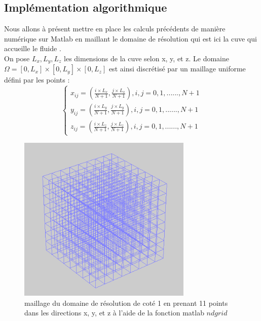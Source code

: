\documentclass[a4paper,12pt,titlepage]{report}
\begin{document}
\begin{onehalfspace}
\subsection{Implémentation algorithmique}

Nous allons à présent mettre en place les calculs précédents de manière numérique sur Matlab en maillant le domaine de résolution qui est ici la cuve qui accueille le fluide .  
\\ 
On pose $ L_x,  L_y,  L_z$ les dimensions de la cuve selon x, y, et z.
\newline
Le domaine $\Omega = [0, L_x]\times[0, L_y]\times[0, L_z]$ est ainsi discrétisé par un maillage uniforme défini par les points : 
\\

\[
\left\{
\begin{array}{ccc}
  x_{ij} = (\frac{i\times L_x}{N+1} ,\frac{j\times L_x}{N+1}),    i,j=0,1,......,N+1\\
  y_{ij} = (\frac{i\times L_y}{N+1} ,\frac{j\times L_y}{N+1}),    i,j=0,1,......,N+1  \\
 z_{ij} = (\frac{i\times L_z}{N+1} ,\frac{j\times L_z}{N+1}),    i,j=0,1,......,N+1  
\end{array}
\right.
\]
\begin{figure}[!h]
	\begin{center}
	\centering
		\includegraphics[height = 8cm, keepaspectratio]{graphes/maillage_droit.png} 
		\caption{maillage du domaine de résolution de coté 1 en prenant 11 points dans les directions x, y, et z à l'aide de la fonction matlab $ndgrid$}
	\end{center}
\end{figure}


\end{onehalfspace}
\end{document}
